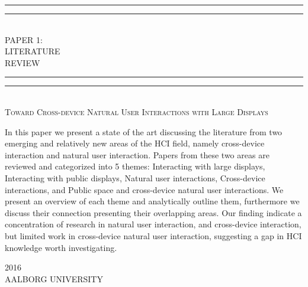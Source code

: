 
\begin{dummy}

		\textheight
		\centering
		\vspace*{\baselineskip}
		\rule{\textwidth}{1.6pt}\vspace*{-\baselineskip}\vspace*{2pt}
		\rule{\textwidth}{0.4pt}\\[\baselineskip]
		{\LARGE PAPER 1: \\ LITERATURE \\[0.3\baselineskip] REVIEW}\\[0.2\baselineskip]
		\rule{\textwidth}{0.4pt}\vspace*{-\baselineskip}\vspace{3.2pt}
		\rule{\textwidth}{1.6pt}\\[\baselineskip]
		\scshape
		{ \large Toward Cross-device Natural User Interactions with Large Displays } \par
		\vspace*{2\baselineskip}
		\vspace*{2\baselineskip}
		\vspace*{2\baselineskip}
		\vspace*{2\baselineskip}
		

		
			\begin{newab}
				In this paper we present a state of the art discussing the literature from two emerging and relatively new areas of the HCI field, namely cross-device interaction and natural user interaction. Papers from these two areas are reviewed and categorized into 5 themes: Interacting with large displays, Interacting with public displays, Natural user interactions, Cross-device interactions, and Public space and cross-device natural user interactions. We present an overview of each theme and analytically outline them, furthermore we discuss their connection presenting their overlapping areas.  Our finding indicate a concentration of research in natural user interaction, and cross-device interaction, but limited work in cross-device natural user interaction, suggesting a gap in HCI knowledge worth investigating.
			\end{newab}

	\vspace*{2\baselineskip}
	\vspace*{2\baselineskip}
	\vspace*{2\baselineskip}
	\vspace*{2\baselineskip}
		{\scshape 2016} \\
		{\large AALBORG UNIVERSITY}\par
	
\end{dummy}